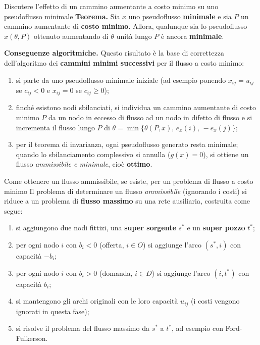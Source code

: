 \documentclass[12pt]{extarticle} %
\begin{document}
\begin{teoriabox}{Discutere l'effetto di un cammino aumentante a costo minimo su uno pseudoflusso minimale}
\textbf{Teorema.} Sia $x$ uno pseudoflusso \textbf{minimale} e sia $P$ un cammino aumentante di \textbf{costo minimo}. Allora, qualunque sia lo pseudoflusso $x(\theta, P)$ ottenuto aumentando di $\theta$ unità lungo $P$ è ancora \textbf{minimale}. %

\noindent\textbf{Conseguenze algoritmiche.} Questo risultato è la base di correttezza dell'algoritmo dei \textbf{cammini minimi successivi} per il flusso a costo minimo: %
\begin{enumerate}
    \item si parte da uno pseudoflusso minimale iniziale (ad esempio ponendo $x_{ij} = u_{ij}$ se $c_{ij} < 0$ e $x_{ij} = 0$ se $c_{ij} \ge 0$); %
    \item finché esistono nodi sbilanciati, si individua un cammino aumentante di costo minimo $P$ da un nodo in eccesso di flusso ad un nodo in difetto di flusso e si incrementa il flusso lungo $P$ di $\theta = \min\{\theta(P,x), \, e_x(i), \, -e_x(j)\}$; %
    \item per il teorema di invarianza, ogni pseudoflusso generato resta minimale; quando lo sbilanciamento complessivo si annulla ($g(x) = 0$), si ottiene un flusso \textit{ammissibile e minimale}, cioè \textbf{ottimo}. %
\end{enumerate}
\end{teoriabox}


\begin{teoriabox}{Come ottenere un flusso ammissibile, se esiste, per un problema di flusso a costo minimo}
Il problema di determinare un flusso \textit{ammissibile} (ignorando i costi) si riduce a un problema di \textbf{flusso massimo} su una rete ausiliaria, costruita come segue: %
\begin{enumerate}
    \item si aggiungono due nodi fittizi, una \textbf{super sorgente} $s^*$ e un \textbf{super pozzo} $t^*$; %
    \item per ogni nodo $i$ con $b_i < 0$ (offerta, $i \in O$) si aggiunge l'arco $(s^*, i)$ con capacità $-b_i$; %
    \item per ogni nodo $i$ con $b_i > 0$ (domanda, $i \in D$) si aggiunge l'arco $(i, t^*)$ con capacità $b_i$; %
    \item si mantengono gli archi originali con le loro capacità $u_{ij}$ (i costi vengono ignorati in questa fase); %
    \item si risolve il problema del flusso massimo da $s^*$ a $t^*$, ad esempio con Ford-Fulkerson. %
\end{enumerate}

\end{teoriabox}
\end{document}
